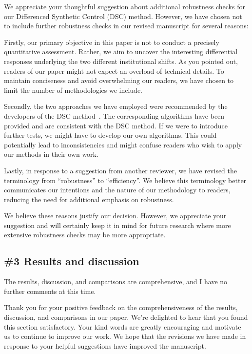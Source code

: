 \AR{} We appreciate your thoughtful suggestion about additional robustness checks for our Differenced Synthetic Control (DSC) method. However, we have chosen not to include further robustness checks in our revised manuscript for several reasons:

\AR*{} Firstly, our primary objective in this paper is not to conduct a precisely quantitative assessment. Rather, we aim to uncover the interesting differential responses underlying the two different institutional shifts. As you pointed out, readers of our paper might not expect an overload of technical details. To maintain conciseness and avoid overwhelming our readers, we have chosen to limit the number of methodologies we include.

\AR*{} Secondly, the two approaches we have employed were recommended by the developers of the DSC method~\cite{engelbrektson2023}.
The corresponding algorithms have been provided and are consistent with the DSC method. If we were to introduce further tests, we might have to develop our own algorithms. This could potentially lead to inconsistencies and might confuse readers who wish to apply our methods in their own work.

\AR*{} Lastly, in response to a suggestion from another reviewer, we have revised the terminology from ``robustness'' to ``efficiency''. We believe this terminology better communicates our intentions and the nature of our methodology to readers, reducing the need for additional emphasis on robustness.

\AR*{} We believe these reasons justify our decision. However, we appreciate your suggestion and will certainly keep it in mind for future research where more extensive robustness checks may be more appropriate.

\subsection{\#3 Results and discussion}\label{sec:2-3}

\RC{} The results, discussion, and comparisons are comprehensive, and I have no further comments at this time.

\AR{} Thank you for your positive feedback on the comprehensiveness of the results, discussion, and comparisons in our paper. We're delighted to hear that you found this section satisfactory. Your kind words are greatly encouraging and motivate us to continue to improve our work. We hope that the revisions we have made in response to your helpful suggestions have improved the manuscript.

